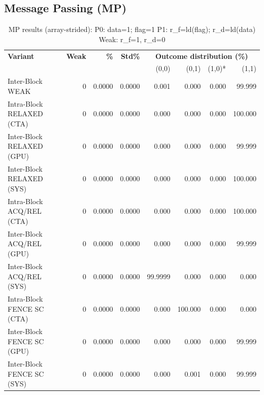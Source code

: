 \documentclass[a4paper]{article}
\begin{document}
\subsection{Message Passing (MP)}

\begin{table}[H]
\centering
\small
\caption{MP results (array-strided): P0: data=1; flag=1 \quad P1: r\_f=ld(flag); r\_d=ld(data) \quad Weak: r\_f=1, r\_d=0}
\label{tab:mp-results}
\begin{tabular}{l|r r r | r r r r}
\toprule
\textbf{Variant} & \textbf{Weak} & \textbf{\%} & \textbf{Std\%} & \multicolumn{4}{c}{\textbf{Outcome distribution (\%)}} \\
                 &               &             &                & (0,0) & (0,1) & (1,0)* & (1,1) \\
\midrule
Inter-Block WEAK          & 0 & 0.0000 & 0.0000 & 0.001 & 0.000 & 0.000 & 99.999 \\
Intra-Block RELAXED (CTA) & 0 & 0.0000 & 0.0000 & 0.000 & 0.000 & 0.000 & 100.000 \\
Inter-Block RELAXED (GPU) & 0 & 0.0000 & 0.0000 & 0.000 & 0.000 & 0.000 & 99.999 \\
Inter-Block RELAXED (SYS) & 0 & 0.0000 & 0.0000 & 0.000 & 0.000 & 0.000 & 100.000 \\
Intra-Block ACQ/REL (CTA) & 0 & 0.0000 & 0.0000 & 0.000 & 0.000 & 0.000 & 100.000 \\
Inter-Block ACQ/REL (GPU) & 0 & 0.0000 & 0.0000 & 0.000 & 0.000 & 0.000 & 99.999 \\
Inter-Block ACQ/REL (SYS) & 0 & 0.0000 & 0.0000 & 99.9999 & 0.000 & 0.000 & 0.000 \\
Intra-Block FENCE SC (CTA)& 0 & 0.0000 & 0.0000 & 0.000 & 100.000 & 0.000 & 0.000 \\
Inter-Block FENCE SC (GPU)& 0 & 0.0000 & 0.0000 & 0.000 & 0.000 & 0.000 & 99.999 \\
Inter-Block FENCE SC (SYS)& 0 & 0.0000 & 0.0000 & 0.000 & 0.001 & 0.000 & 99.999 \\
\bottomrule
\end{tabular}
\end{table}
\end{document}
